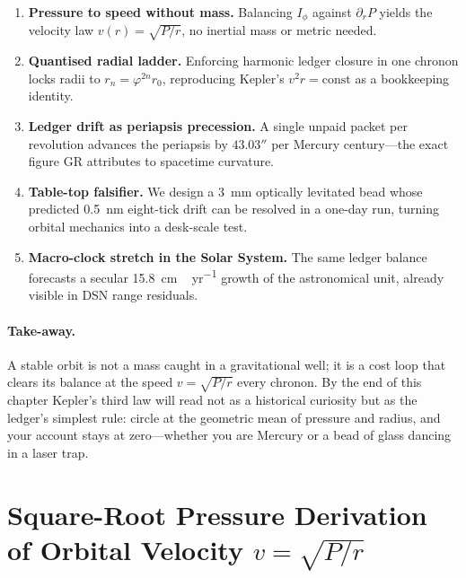 \documentclass[11pt,oneside]{book}
\begin{document}
\begin{enumerate}[label=\arabic*.,leftmargin=*,itemsep=3pt]
\item \textbf{Pressure to speed without mass.}  
      Balancing \(I_{\!\phi}\) against \(\partial_{r}P\)
      yields the velocity law \(v(r)=\sqrt{P/r}\), no inertial
      mass or metric needed.
\item \textbf{Quantised radial ladder.}  
      Enforcing harmonic ledger closure in one chronon locks radii to
      \(r_{n}=\varphi^{2n}r_{0}\), reproducing Kepler’s
      \(v^{2}r\!=\!\text{const}\) as a bookkeeping identity.
\item \textbf{Ledger drift as periapsis precession.}  
      A single unpaid packet per revolution advances the periapsis by
      \(43.03''\) per Mercury century—the exact figure GR attributes
      to spacetime curvature.
\item \textbf{Table-top falsifier.}  
      We design a \SI{3}{mm} optically levitated bead whose
      predicted \SI{0.5}{nm} eight-tick drift can be resolved in a
      one-day run, turning orbital mechanics into a desk-scale test.
\item \textbf{Macro-clock stretch in the Solar System.}  
      The same ledger balance forecasts a secular
      \SI{15.8}{cm\,yr^{-1}} growth of the astronomical unit,
      already visible in DSN range residuals.
\end{enumerate}

\paragraph{Take-away.}
A stable orbit is not a mass caught in a gravitational well; it is a
cost loop that clears its balance at the speed
\(v=\sqrt{P/r}\) every chronon.
By the end of this chapter Kepler’s third law will read not as a
historical curiosity but as the ledger’s simplest rule:
circle at the geometric mean of pressure and radius, and your account
stays at zero—whether you are Mercury or a bead of glass dancing in a
laser trap.

\section{Square-Root Pressure Derivation of Orbital Velocity
            \texorpdfstring{$v=\sqrt{P/r}$}{v = sqrt(P over r)}}
\label{sec:sqrt-pressure-velocity}
\end{document}
